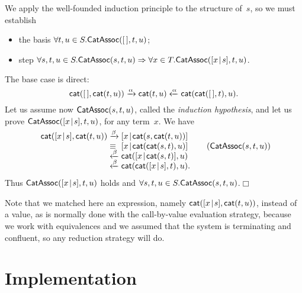 We apply the well\hyp{}founded induction principle to the structure
of~\(s\), so we must establish
\begin{itemize}

  \item the basis \(\forall t,u \in S.\textsf{CatAssoc}({[\,],t,u})\);

  \item step \(\forall s,t,u \in S.\textsf{CatAssoc}({s,t,u})
    \Rightarrow \forall x \in T.\textsf{CatAssoc}({[{x}\!\mid\!{s}],t,u})\).

\end{itemize}
The base case is direct:
\begin{equation*}
  \fun{cat}(\el,\fun{cat}(t,u))
\xrightarrow{\smash{\alpha}} \fun{cat}(t,u)
\xleftarrow{\smash{\alpha}}
\fun{cat}(\fun{cat}(\el,t),u).
\index{cat@\fun{cat/2}}
\end{equation*}
Let us assume now \(\textsf{CatAssoc}({s,t,u})\), called the
\emph{induction hypothesis}, and
let us prove
\(\textsf{CatAssoc}({[{x}\!\mid\!{s}],t,u})\),
for any term~\(x\). We have
\begin{equation*}
\begin{array}{r@{\;}l@{\;}l@{\qquad}r@{}}
  \fun{cat}(\cons{x}{s},\fun{cat}(t,u))
& \xrightarrow{\smash\beta}
& \cons{x}{\fun{cat}(s,\fun{cat}(t,u))}\\
& \equiv
& \cons{x}{\fun{cat}(\fun{cat}(s,t),u)}
& (\pred{CatAssoc}{s,t,u})\\
& \xleftarrow{\smash\beta}
& \fun{cat}(\cons{x}{\fun{cat}(s,t)},u)\\
& \xleftarrow{\smash\beta}
& \fun{cat}(\fun{cat}(\cons{x}{s},t),u).\index{cat@\fun{cat/2}}
\end{array}
\end{equation*}
Thus
\(\textsf{CatAssoc}({[{x}\!\mid\!{s}],t,u})\) holds and \(\forall s,t,u \in
S.\textsf{CatAssoc}({s,t,u})\).\hfill\(\Box\)

Note that we matched here an expression, namely
\(\textsf{cat}([{x}\!\mid\!{s}],\textsf{cat}(t,u))\), instead of a value, as is
normally done with the call\hyp{}by\hyp{}value evaluation strategy,
because we work with equivalences and we assumed that the system is
terminating and confluent, so any reduction strategy will do.


\section{Implementation}
\label{sec:implementation}

